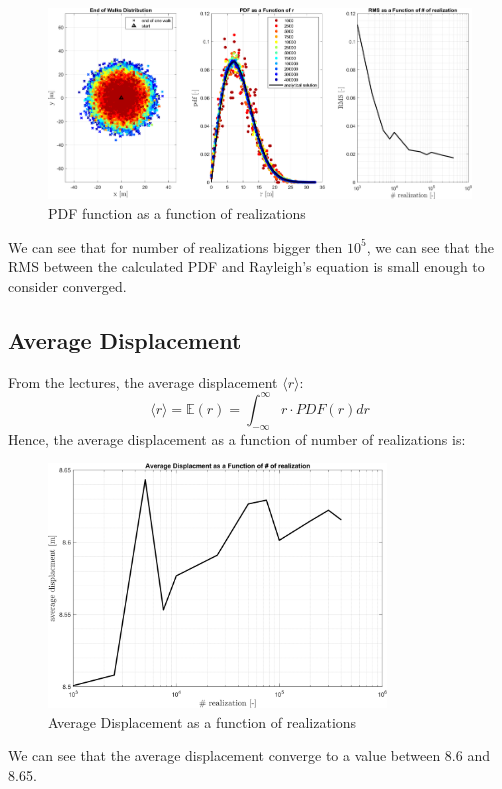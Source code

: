 \documentclass[11pt, a4paper]{article}
\begin{document}
\begin{figure}[H]
    \centering
    \includegraphics[width=\textwidth]{images/graph2.png}
    \caption{PDF function as a function of realizations}
    \label{fig: pdf for different realizations}
\end{figure}
\noindent We can see that for number of realizations bigger then $10^5$, we can see that the RMS between the calculated PDF and Rayleigh's equation is small enough to consider converged. 

\subsection{Average Displacement}
From the lectures, the average displacement $\langle r\rangle$:
\begin{equation}
    \langle r\rangle=\mathbb{E}\left(r\right)=\int_{-\infty}^\infty{r\cdot PDF\left(r\right)dr}
\end{equation}
Hence, the average displacement as a function of number of realizations is:
\begin{figure}[H]
    \centering
    \includegraphics[width=0.8\textwidth]{images/graph3.png}
    \caption{Average Displacement as a function of realizations}
    \label{fig: average displacement as a function of realizations}
\end{figure}
\noindent We can see that the average displacement converge to a value between 8.6 and 8.65.
\end{document}
